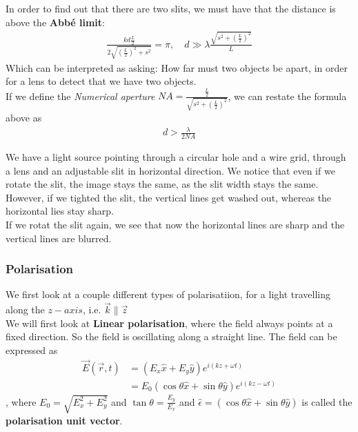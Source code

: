 In order to find out that there are two slits, we must have that the distance is above the \textbf{Abbé limit}:
\begin{align*}
				\frac{kd \frac{L}{2}}{2 \sqrt{(\frac{L}{2})^2 + s^2}} = \pi, \quad d \gg \lambda \frac{\sqrt{s^2 + (\frac{L}{2})^2}}{L} 
\end{align*}
Which can be interpreted as asking: How far must two objects be apart, in order for a lens to detect that we have two objects.\\

If we define the \emph{Numerical aperture} $NA = \frac{\frac{L}{2}}{\sqrt{s^2 + (\frac{L}{2})^2}}$, we can restate the formula above as
\begin{align*}
	d > \frac{\lambda}{2 NA}
\end{align*}


\begin{demo}
	We have a light source pointing through a circular hole and a wire grid, through a lens and an adjustable slit in horizontal direction.
	We notice that even if we rotate the slit, the image stays the same, as the slit width stays the same.\\
	However, if we tighted the slit, the vertical lines get washed out, whereas the horizontal lies stay sharp.\\
	If we rotat the slit again, we see that now the horizontal lines are sharp and the vertical lines are blurred.
\end{demo}


\subsubsection{Polarisation}
We first look at a couple different types of polarisatiion, for a light travelling along the $z-axis$, i.e. $\vec{k} \parallel \vec{z}$\\

We will first look at \textbf{Linear polarisation}, where the field always points at a fixed direction. So the field is oscillating along a straight line. The field can be expressed as
\begin{align*}
	\vec{E}(\vec{r},t) &= (E_x \hat{x} + E_y\hat{y})e^{i(kz + \omega t)}\\
		 &= E_0 (\cos\theta \hat{x} + \sin \theta \hat{y}) e^{i(kz - \omega t)}
\end{align*}
, where $E_0 = \sqrt{E_x^2 + E_y^2}$ and $\tan \theta = \frac{E_y}{E_x}$ and $\hat{\epsilon} = (\cos\theta \hat{x} + \sin \theta \hat{y})$ is called the \textbf{polarisation unit vector}.\\


